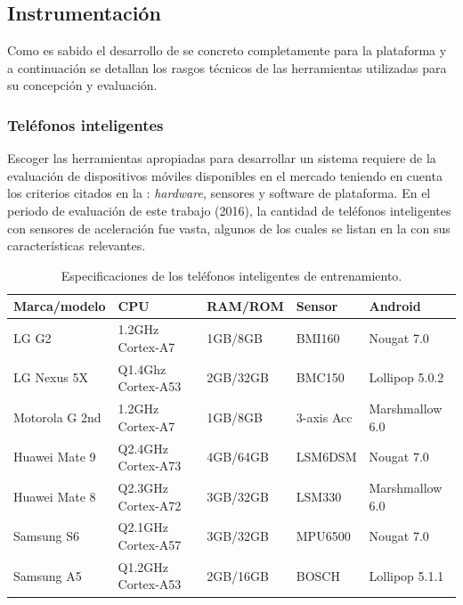 \subsection{Instrumentación}

Como es sabido el desarrollo de \emph{ }se concreto
completamente para la plataforma \emph{ }y a continuación
se detallan los rasgos técnicos de las herramientas utilizadas para
su concepción y evaluación.

\subsubsection{Teléfonos inteligentes}

Escoger las herramientas apropiadas para desarrollar un sistema 
requiere de la evaluación de dispositivos móviles disponibles en el
mercado teniendo en cuenta los criterios citados en la :
\emph{hardware}, sensores y software de plataforma. En el periodo
de evaluación de este trabajo (2016), la cantidad de teléfonos inteligentes
con sensores de aceleración fue vasta, algunos de los cuales se listan
en la  con sus características relevantes.

\begin{table}[h]
\begin{centering}
\begin{tabular}{|l|>{\raggedright}p{2.5cm}|l|>{\raggedright}p{2cm}|l|}
\hline 
Marca/modelo & CPU & RAM/ROM & Sensor & Android\tabularnewline
\hline 
\hline 
LG G2 & 1.2GHz Cortex-A7 & 1GB/8GB & BMI160 & Nougat 7.0\tabularnewline
\hline 
LG Nexus 5X & Q1.4Ghz Cortex-A53 & 2GB/32GB & BMC150 & Lollipop 5.0.2\tabularnewline
\hline 
Motorola G 2nd & 1.2GHz Cortex-A7 & 1GB/8GB & 3-axis Acc & Marshmallow 6.0\tabularnewline
\hline 
Huawei Mate 9 & Q2.4GHz Cortex-A73 & 4GB/64GB & LSM6DSM & Nougat 7.0\tabularnewline
\hline 
Huawei Mate 8 & Q2.3GHz Cortex-A72 & 3GB/32GB & LSM330  & Marshmallow 6.0\tabularnewline
\hline 
Samsung S6 & Q2.1GHz Cortex-A57 & 3GB/32GB & MPU6500 & Nougat 7.0\tabularnewline
\hline 
Samsung A5 & Q1.2GHz Cortex-A53  & 2GB/16GB & BOSCH & Lollipop 5.1.1\tabularnewline
\hline 
\end{tabular}
\par\end{centering}
\caption[Especificaciones de teléfonos inteligentes]{\label{tab6:dispositivos}Especificaciones de los teléfonos inteligentes
de entrenamiento.}
\end{table}

